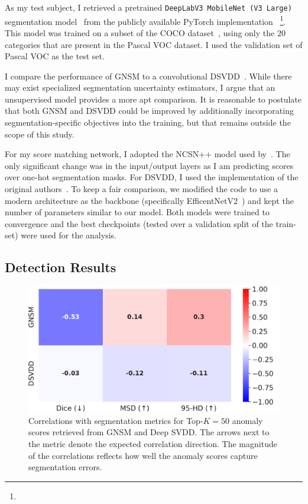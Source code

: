 As my test subject, I retrieved a pretrained \texttt{DeepLabV3 MobileNet (V3 Large)} segmentation model~\cite{chen2017rethinking} from the publicly available PyTorch implementation ~\footnote{\tiny {}}. This model was trained on a subset of the COCO dataset~\cite{cocodataset}, using only the 20 categories that are present in the Pascal VOC dataset. I used the validation set of Pascal VOC as the test set.

I compare the performance of GNSM to a convolutional DSVDD~\cite{pmlr-v80-ruff18a}. While there may exist specialized segmentation uncertainty estimators, I argue that an unsupervised model provides a more apt comparison. It is reasonable to postulate that both GNSM and DSVDD could be improved by additionally incorporating segmentation-specific objectives into the training, but that remains outside the scope of this study. 

For my score matching network, I adopted the NCSN++ model used by~\cite{song2020score}. The only significant change was in the input/output layers as I am predicting scores over one-hot segmentation masks. For DSVDD, I used the implementation of the original authors~\cite{pmlr-v80-ruff18a}. To keep a fair comparison, we modified the code to use a modern architecture as the backbone (specifically EfficentNetV2~\cite{tan2021efficientnetv2}) and kept the number of parameters similar to our model. Both models were trained to convergence and the best checkpoints (tested over a validation split of the train-set) were used for the analysis.

\subsection*{Detection Results}
\label{seg_results}

\begin{figure}[htbp]
  \centering
  \includegraphics[width=0.7\columnwidth]{figures/voc_heatmap.pdf}
  \caption{Correlations with segmentation metrics for Top-$K=50$ anomaly scores retrieved from GNSM and Deep SVDD. The arrows next to the metric denote the expected correlation direction. The magnitude of the correlations reflects how well the anomaly scores capture segmentation errors.}
\label{corrs}
\end{figure}


